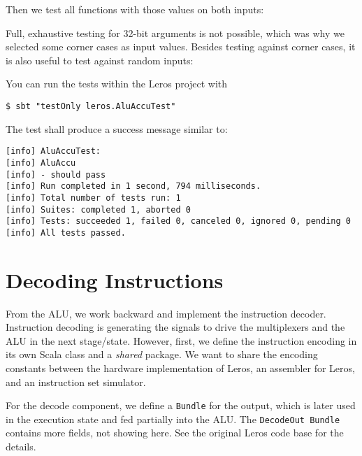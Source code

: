 \documentclass[%
    10pt,
    headinclude, footexclude,
    openright, %
    notitlepage,
    cleardoubleempty,
    headsepline,
    pointlessnumbers,
    bibtotoc, idxtotoc,
    ]{scrbook}
\newcommand{\code}[1]{{\lstinline[basicstyle=\small\ttfamily]{#1}}}
\newcommand{\todo}[1]{{\emph{TODO: #1}}}
\renewcommand{\todo}[1]{}
\begin{document}
\noindent Then we test all functions with those values on both inputs:


\noindent Full, exhaustive testing for 32-bit arguments is not possible, which was why we
selected some corner cases as input values. Besides testing against corner cases, it is also useful
to test against random inputs:


\noindent You can run the tests within the Leros project with

\begin{verbatim}
$ sbt "testOnly leros.AluAccuTest"
\end{verbatim}

The test shall produce a success message similar to:

\begin{verbatim}
[info] AluAccuTest:
[info] AluAccu
[info] - should pass
[info] Run completed in 1 second, 794 milliseconds.
[info] Total number of tests run: 1
[info] Suites: completed 1, aborted 0
[info] Tests: succeeded 1, failed 0, canceled 0, ignored 0, pending 0
[info] All tests passed.
\end{verbatim}

\section{Decoding Instructions}


From the ALU, we work backward and implement the instruction decoder.
Instruction decoding is generating the signals to drive the multiplexers
and the ALU in the next stage/state.
However, first, we define the instruction encoding in its own Scala class and
a \emph{shared} package. We want to share the encoding constants between
the hardware implementation of Leros, an assembler for Leros, and an instruction
set simulator.


\todo{Update code when Leros is more complete, as stuff is missing.}

\noindent For the decode component, we define a \code{Bundle} for the output,
which is later used in the execution state and fed partially into the ALU.
The \code{DecodeOut Bundle} contains more fields,
not showing here. See the original Leros code base for the details.
\end{document}
